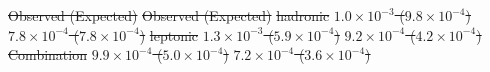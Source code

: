 \documentclass[PAPER, coverpage, atlasdraft=true, texlive=2016, UKenglish]{\ATLASLATEXPATH atlasdoc}
\providecommand{\DIFadd}[1]{{\protect\color{blue}\uwave{#1}}} %
\providecommand{\DIFdel}[1]{{\protect\color{red}\sout{#1}}}                      %
\providecommand{\DIFaddend}{} %
\providecommand{\DIFaddFL}[1]{\DIFadd{#1}} %
\providecommand{\DIFdelFL}[1]{\DIFdel{#1}} %
\providecommand{\DIFaddbeginFL}{} %
\providecommand{\DIFaddendFL}{} %
\providecommand{\DIFdelbeginFL}{} %
\providecommand{\DIFdelendFL}{} %
\begin{document}
\DIFaddend \begin{table}[t!]
  \caption{\DIFdelbeginFL %
\DIFdelendFL \DIFaddbeginFL \small{Summary of 95\% CL upper limits on $\BR(t \to cH)$ and $\BR(t \to uH)$, significance and fitted signal strength($\mu$) in signal regions with a
  benchmark branching ratio of $\BR(t \to qH)=0.1\%$}\DIFaddFL{.}\DIFaddendFL }
\begin{center}
\DIFdelbeginFL %
\DIFdelFL{Observed (Expected) }%
\DIFdelFL{Observed (Expected)  }%
\DIFdelFL{hadronic  }%
\DIFdelFL{$1.0 \times 10^{-3}$ ($9.8 \times 10^{-4}$) }%
\DIFdelFL{$7.8 \times 10^{-4}$ ($7.8 \times 10^{-4}$) }%
\DIFdelFL{leptonic  }%
\DIFdelFL{$1.3 \times 10^{-3}$ ($5.9 \times 10^{-4}$) }%
\DIFdelFL{$9.2 \times 10^{-4}$ ($4.2 \times 10^{-4}$) }%
\DIFdelFL{Combination  }%
\DIFdelFL{$9.9 \times 10^{-4}$ ($5.0 \times 10^{-4}$) }%
\DIFdelFL{$7.2 \times 10^{-4}$ ($3.6 \times 10^{-4}$) }%
\DIFdelendFL \DIFaddbeginFL {}
\end{center}
\end{table}
\end{document}
